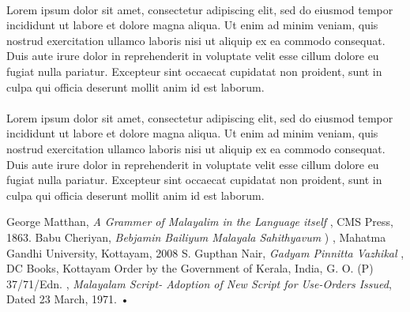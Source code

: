 \documentclass[10pt]{article}
\begin{document}
\paragraph{}
Lorem ipsum dolor sit amet, consectetur adipiscing elit, sed do eiusmod tempor incididunt ut labore et dolore magna aliqua. Ut enim ad minim veniam, quis nostrud exercitation ullamco laboris nisi ut aliquip ex ea commodo consequat. Duis aute irure dolor in reprehenderit in voluptate velit esse cillum dolore eu fugiat nulla pariatur. Excepteur sint occaecat cupidatat non proident, sunt in culpa qui officia deserunt mollit anim id est laborum.

\paragraph{}
Lorem ipsum dolor sit amet, consectetur adipiscing elit, sed do eiusmod tempor incididunt ut labore et dolore magna aliqua. Ut enim ad minim veniam, quis nostrud exercitation ullamco laboris nisi ut aliquip ex ea commodo consequat. Duis aute irure dolor in reprehenderit in voluptate velit esse cillum dolore eu fugiat nulla pariatur. Excepteur sint occaecat cupidatat non proident, sunt in culpa qui officia deserunt mollit anim id est laborum.


\begin{thebibliography}{9}
 George Matthan, \textit{A Grammer of Malayalim in the Language itself },  CMS Press, 1863.
 Babu Cheriyan, \textit{Bebjamin Bailiyum Malayala Sahithyavum} \begingroup {}) \endgroup, Mahatma Gandhi University, Kottayam, 2008
 S. Gupthan Nair, \textit{Gadyam Pinnitta Vazhikal}\begingroup {} \endgroup, DC Books, Kottayam
 Order by the Government of Kerala, India, G. O. (P) 37/71/Edn. , \textit{Malayalam Script- Adoption of New Script for Use-Orders Issued}, Dated 23 March, 1971.
•


\end{thebibliography}
\end{document}
